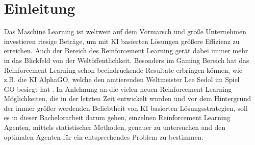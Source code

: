 \chapter{Einleitung}\label{sec:beispiel}
Das Maschine Learning ist weltweit auf dem Vormarsch und große Unternehmen investieren riesige Beträge, um mit KI basierten Lösungen größere Effizienz zu erreichen. Auch der Bereich des Reinforcement Learning gerät dabei immer mehr in das Blickfeld von der Weltöffentlichkeit. Besonders im Gaming Bereich hat das Reinforcement Learning schon beeindruckende Resultate erbringen können, wie z.B. die KI AlphaGO, welche den amtierenden Weltmeister Lee Sedol im Spiel GO besiegt hat \cite{UAV}. In Anlehnung an die vielen neuen Reinforcement Learning Möglichkeiten, die in der letzten Zeit entwickelt wurden und vor dem Hintergrund der immer größer werdenden Beliebtheit von KI basierten Lösungsstrategien, soll es in dieser Bachelorarbeit darum gehen, einzelnen Reinforcement Learning Agenten, mittels statistischer Methoden, genauer zu untersuchen and den optimalen Agenten für ein entsprechendes Problem zu bestimmen.

